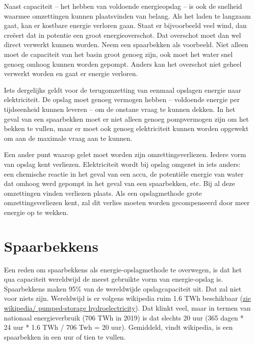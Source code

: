 \documentclass[
  11pt,
  a4paper,
]{book}
\begin{document}
Naast capaciteit -- het hebben van voldoende energieopslag -- is ook de snelheid waarmee omzettingen kunnen plaatsvinden van belang. Als het laden te langzaam gaat, kan er kostbare energie verloren gaan. Staat er bijvoorbeeld veel wind, dan creëert dat in potentie een groot energieoverschot. Dat overschot moet dan wel direct verwerkt kunnen worden. Neem een spaarbekken als voorbeeld. Niet alleen moet de capaciteit van het basin groot genoeg zijn, ook moet het water snel genoeg omhoog kunnen worden gepompt. Anders kan het overschot niet geheel verwerkt worden en gaat er energie verloren.

Iets dergelijks geldt voor de terugomzetting van eenmaal opslagen energie naar elektriciteit. De opslag moet genoeg vermogen hebben -- voldoende energie per tijdseenheid kunnen leveren -- om de onstane vraag te kunnen dekken. In het geval van een spaarbekken moet er niet alleen genoeg pompvermogen zijn om het bekken te vullen, maar er moet ook genoeg elektriciteit kunnen worden opgewekt om aan de maximale vraag aan te kunnen.

Een ander punt waarop gelet moet worden zijn omzettingsverliezen. Iedere vorm van opslag kent verliezen. Elektriciteit wordt bij opslag omgezet in iets anders: een chemische reactie in het geval van een accu, de potentiële energie van water dat omhoog werd gepompt in het geval van een spaarbekken, etc. Bij al deze omzettingen vinden verliezen plaats. Als een opslagmethode grote omzettingsverliezen kent, zal dit verlies moeten worden gecompenseerd door meer energie op te wekken.

\hypertarget{spaarbekkens}{%
\section{Spaarbekkens}\label{spaarbekkens}}

Een reden om spaarbekkens als energie-opslagmethode te overwegen, is dat het qua capaciteit wereldwijd de meest gebruikte vorm van energie-opslag is. Spaarbekkens maken 95\% van de wereldwijde opslagcapaciteit uit. Dat zal niet voor niets zijn. Wereldwijd is er volgens wikipedia ruim 1.6 TWh beschikbaar (\href{https://en.wikipedia.org/wiki/Pumped-storage_hydroelectricity}{zie wikipedia/ pumped-storage hydroelectricity}). Dat klinkt veel, maar in termen van nationaal energieverbruik (706 TWh in 2019) is dat slechts 20 uur (365 dagen * 24 uur * 1.6 TWh / 706 Twh = 20 uur). Gemiddeld, vindt wikipedia, is een spaarbekken in een uur of tien te vullen.
\end{document}
